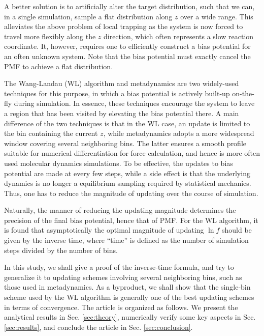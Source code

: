 \documentclass[reprint]{revtex4-1}
\begin{document}
A better solution is to artificially alter
the target distribution,
such that we can, in a single simulation, sample
a flat distribution\cite{mezei1987, berg1992, lee1993,
wang2001, wang2001pre, laio2002}
along $z$ over a wide range.
%
This alleviates the above problem of local trapping
as the system is now forced to travel more flexibly
along the $z$ direction,
which often represents a slow reaction coordinate.
%
It, however, requires one to efficiently construct a
bias potential for an often unknown system.
%
Note that the bias potential must exactly cancel the PMF
to achieve a flat distribution.



The Wang-Landau (WL) algorithm\cite{wang2001, wang2001pre}
and metadynamics\cite{laio2002}
are two widely-used techniques for this purpose,
in which a bias potential is actively built-up on-the-fly
during simulation.
%
In essence, these techniques
encourage the system to leave a region that has been visited
by elevating the bias potential there.
%
A main difference of the two techniques
is that in the WL case, an update is limited to the bin
containing the current $z$,
while metadynamics adopts a more widespread window
covering several neighboring bins.
%
The latter ensures a smooth profile
suitable for numerical differentiation for force calculation,
and hence is more often used molecular dynamics simulations.
%
To be effective, the updates to bias potential
are made at every few steps,
while a side effect is that the underlying dynamics
is no longer a equilibrium sampling
required by statistical mechanics.
%
Thus, one has to reduce the magnitude of updating
over the course of simulation.



Naturally, the manner of reducing
the updating magnitude\cite{
belardinelli2007, belardinelli2007jcp, belardinelli2008,
morozov2007, zhou2008, morozov2009,
komura2012, caparica2012, caparica2014}
determines the precision of the final bias potential,
hence that of PMF.
%
For the WL algorithm, it is found
that asymptotically the optimal magnitude of updating $\ln f$
should be given by the
inverse time\cite{
belardinelli2007, belardinelli2007jcp, belardinelli2008,
morozov2007, zhou2008},
where ``time'' is defined as
the number of simulation steps
divided by the number of bins.


In this study,
we shall give a proof of the inverse-time formula,
and try to generalize it to
updating schemes involving several neighboring bins,
such as those used in metadynamics.
%
As a byproduct, we shall show that
the single-bin scheme used by the WL algorithm
is generally one of the best
updating schemes in terms of convergence.
%
The article is organized as follows.
%
We present the analytical results in Sec. \ref{sec:theory},
numerically verify some key aspects
in Sec. \ref{sec:results},
and conclude the article
in Sec. \ref{sec:conclusion}.
\end{document}
